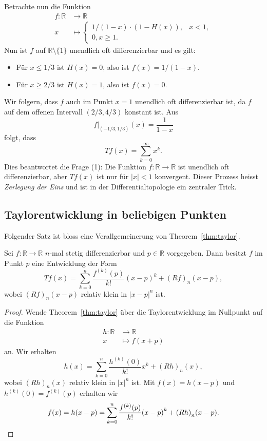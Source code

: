 \documentclass[../main.tex]{subfiles}
\begin{document}
\begin{examples}
\begin{enumerate}[(1)]
      Betrachte nun die Funktion
      \begin{align*}
        f \colon \mathbb{R} & \to \mathbb{R} \\
        x & \mapsto 
        \begin{cases}
          1/(1- x) \cdot (1 - H(x)), & x < 1,\\
          0, x \geq 1.
        \end{cases}
      \end{align*}
      Nun ist $f$ auf $\mathbb{R} \setminus \{1\}$
      unendlich oft differenzierbar und es gilt:
      \begin{itemize}
        \item Für $x \leq 1/3$ ist $H(x) = 0$, also
          ist $f(x) = 1/(1- x)$.
        \item Für $x \geq 2/3$ ist $H(x) = 1$, also
          ist $f(x) = 0$.
      \end{itemize}
      Wir folgern, dass $f$ auch im Punkt $x = 1$ 
      unendlich oft differenzierbar ist,
      da $f$ auf dem offenen Intervall $(2/3, 4/3)$ konstant ist.
      Aus
      \[
        f|_{(-1/3, 1/3)}(x) = \frac{1}{1-x}
      \]
      folgt, dass
      \[
        Tf(x) = \sum_{k=0}^{\infty} x^k.
      \]
      Dies beantwortet die Frage (1): Die Funktion $f \colon \mathbb{R} \to \mathbb{R}$ 
      ist unendlich oft differenzierbar, aber $Tf(x)$ ist nur für $|x| < 1$ konvergent.
      Dieser Prozess heisst \emph{Zerlegung der Eins} und ist in der Differentialtopologie
      ein zentraler Trick.
  \end{enumerate}
\end{examples}

\subsection*{Taylorentwicklung in beliebigen Punkten}
Folgender Satz ist bloss eine Verallgemeinerung von Theorem~\ref{thm:taylor}.

\begin{theorem}
  Sei $f \colon \mathbb{R} \to \mathbb{R}$ $n$-mal stetig differenzierbar
  und $p \in \mathbb{R}$ vorgegeben.
  Dann besitzt $f$ im Punkt $p$ eine Entwicklung der Form
  \[
    Tf(x) = \sum_{k=0}^{n} \frac{f^{(k)}(p)}{k!} {(x - p)}^k + {(Rf)}_n(x - p),
  \]
  wobei ${(Rf)}_n (x - p)$ relativ klein in $|x - p|^n$ ist.
\end{theorem}

\begin{proof}
  Wende Theorem~\ref{thm:taylor} über die Taylorentwicklung im Nullpunkt
  auf die Funktion
  \begin{align*}
    h \colon \mathbb{R} & \to \mathbb{R} \\
    x & \mapsto f(x + p)
  \end{align*}
  an. Wir erhalten
  \[
    h(x) = \sum_{k=0}^{n} \frac{h^{(k)}(0)}{k!} x^k + {(Rh)}_n(x),
  \]
  wobei ${(Rh)}_n(x)$ relativ klein in $|x|^n$ ist.
  Mit $f(x) = h(x - p)$ und $h^{(k)}(0) = f^{(k)}(p)$ erhalten wir
  \[
    f(x) = h(x - p) = \sum_{k=0}^{n} \frac{f^{(k)}(p)}{k!}{(x-p)}^k + {(Rh)}_n(x-p).
    \qedhere
  \]
\end{proof}
\end{document}
